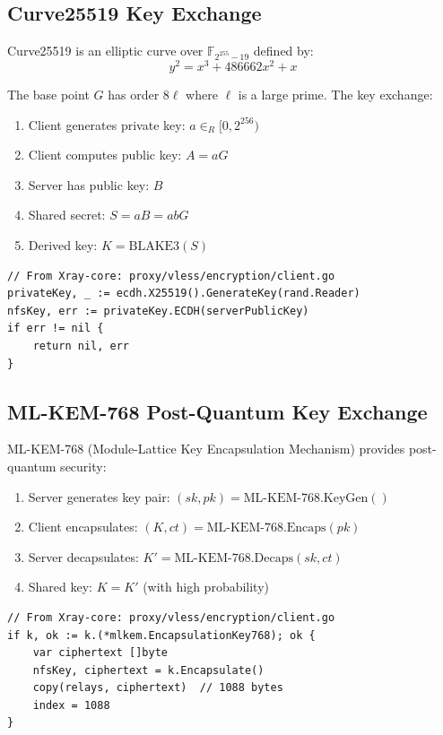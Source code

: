 \subsection{Curve25519 Key Exchange}

Curve25519 is an elliptic curve over $\mathbb{F}_{2^{255}-19}$ defined by:
\[
y^2 = x^3 + 486662x^2 + x
\]

The base point $G$ has order $8\ell$ where $\ell$ is a large prime. The key exchange:

\begin{enumerate}
    \item Client generates private key: $a \in_R [0, 2^{256})$
    \item Client computes public key: $A = aG$
    \item Server has public key: $B$
    \item Shared secret: $S = aB = abG$
    \item Derived key: $K = \text{BLAKE3}(S)$
\end{enumerate}

\begin{verbatim}
// From Xray-core: proxy/vless/encryption/client.go
privateKey, _ := ecdh.X25519().GenerateKey(rand.Reader)
nfsKey, err := privateKey.ECDH(serverPublicKey)
if err != nil {
    return nil, err
}
\end{verbatim}

\subsection{ML-KEM-768 Post-Quantum Key Exchange}

ML-KEM-768 (Module-Lattice Key Encapsulation Mechanism) provides post-quantum security:

\begin{enumerate}
    \item Server generates key pair: $(sk, pk) = \text{ML-KEM-768.KeyGen}()$
    \item Client encapsulates: $(K, ct) = \text{ML-KEM-768.Encaps}(pk)$
    \item Server decapsulates: $K' = \text{ML-KEM-768.Decaps}(sk, ct)$
    \item Shared key: $K = K'$ (with high probability)
\end{enumerate}

\begin{verbatim}
// From Xray-core: proxy/vless/encryption/client.go
if k, ok := k.(*mlkem.EncapsulationKey768); ok {
    var ciphertext []byte
    nfsKey, ciphertext = k.Encapsulate()
    copy(relays, ciphertext)  // 1088 bytes
    index = 1088
}
\end{verbatim}

